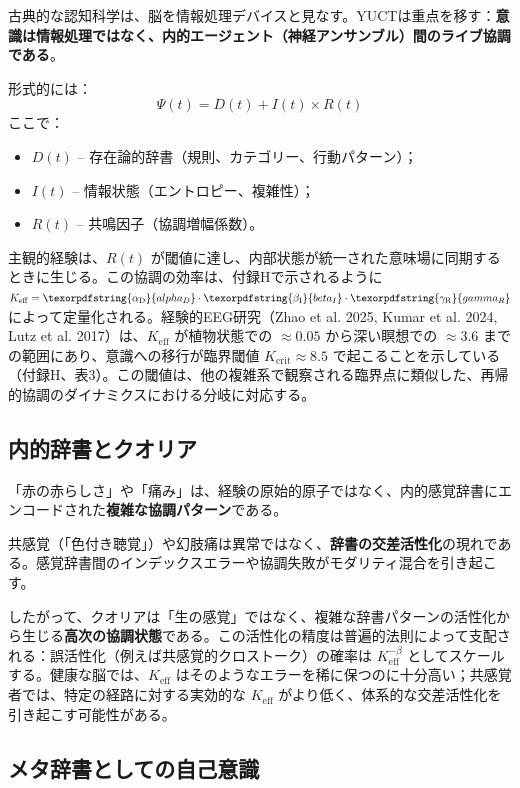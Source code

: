 \documentclass[12pt,a4paper]{article}
\DeclareRobustCommand{\alD}{\texorpdfstring{\ensuremath{\alpha_{\mathrm{D}}}}{alpha_D}}
\DeclareRobustCommand{\beI}{\texorpdfstring{\ensuremath{\beta_{\mathrm{I}}}}{beta_I}}
\DeclareRobustCommand{\gaR}{\texorpdfstring{\ensuremath{\gamma_{\mathrm{R}}}}{gamma_R}}
\newcommand{\eff}{\mathrm{eff}}
\newcommand{\Ke}{K_{\eff}}
\newcommand{\Kcrit}{K_{\mathrm{crit}}}
\begin{document}
	古典的な認知科学は、脳を情報処理デバイスと見なす。YUCTは重点を移す：\textbf{意識は情報処理ではなく、内的エージェント（神経アンサンブル）間のライブ協調である}。
	
	形式的には：
	\[
	\Psi(t) = D(t) + I(t) \times R(t)
	\]
	ここで：
	\begin{itemize}
		\item $D(t)$ – 存在論的辞書（規則、カテゴリー、行動パターン）；
		\item $I(t)$ – 情報状態（エントロピー、複雑性）；
		\item $R(t)$ – 共鳴因子（協調増幅係数）。
	\end{itemize}
	
	主観的経験は、$R(t)$ が閾値に達し、内部状態が統一された意味場に同期するときに生じる。この協調の効率は、付録Hで示されるように \(\Ke = \alD \cdot \beI \cdot \gaR\) によって定量化される。経験的EEG研究（Zhao et al. 2025, Kumar et al. 2024, Lutz et al. 2017）は、\(\Ke\) が植物状態での \(\approx 0.05\) から深い瞑想での \(\approx 3.6\) までの範囲にあり、意識への移行が臨界閾値 \(\Kcrit \approx 8.5\) で起こることを示している（付録H、表3）。この閾値は、他の複雑系で観察される臨界点に類似した、再帰的協調のダイナミクスにおける分岐に対応する。
	
	\subsection{内的辞書とクオリア}
	
	「赤の赤らしさ」や「痛み」は、経験の原始的原子ではなく、内的感覚辞書にエンコードされた\textbf{複雑な協調パターン}である。
	
	\begin{tcolorbox}[title=例：共感覚と幻肢痛]
		共感覚（「色付き聴覚」）や幻肢痛は異常ではなく、\textbf{辞書の交差活性化}の現れである。感覚辞書間のインデックスエラーや協調失敗がモダリティ混合を引き起こす。
	\end{tcolorbox}
	
	したがって、クオリアは「生の感覚」ではなく、複雑な辞書パターンの活性化から生じる\textbf{高次の協調状態}である。この活性化の精度は普遍的法則によって支配される：誤活性化（例えば共感覚的クロストーク）の確率は \(\Ke^{-\beta}\) としてスケールする。健康な脳では、\(\Ke\) はそのようなエラーを稀に保つのに十分高い；共感覚者では、特定の経路に対する実効的な \(\Ke\) がより低く、体系的な交差活性化を引き起こす可能性がある。
	
	\subsection{メタ辞書としての自己意識}
	
\end{document}
